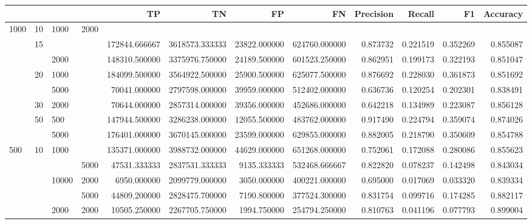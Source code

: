 \begin{tabular}{llllrrrrrrrr}
\toprule
     &    &      &      &             TP &              TN &            FP &             FN &  Precision &    Recall &        F1 &  Accuracy \\
\midrule
1000 & 10 & 1000 & 2000 &                &                 &               &                &            &           &           &           \\
     & 15 &      &      &  172844.666667 &  3618573.333333 &  23822.000000 &  624760.000000 &   0.873732 &  0.221519 &  0.352269 &  0.855087 \\
     &    & 2000 &      &  148310.500000 &  3375976.750000 &  24189.500000 &  601523.250000 &   0.862951 &  0.199173 &  0.322193 &  0.851047 \\
     & 20 & 1000 &      &  184099.500000 &  3564922.500000 &  25900.500000 &  625077.500000 &   0.876692 &  0.228030 &  0.361873 &  0.851692 \\
     &    & 5000 &      &   70041.000000 &  2797598.000000 &  39959.000000 &  512402.000000 &   0.636736 &  0.120254 &  0.202301 &  0.838491 \\
     & 30 & 2000 &      &   70644.000000 &  2857314.000000 &  39356.000000 &  452686.000000 &   0.642218 &  0.134989 &  0.223087 &  0.856128 \\
     & 50 & 500 &      &  147944.500000 &  3286238.000000 &  12055.500000 &  483762.000000 &   0.917490 &  0.224794 &  0.359074 &  0.874026 \\
     &    & 5000 &      &  176401.000000 &  3670145.000000 &  23599.000000 &  629855.000000 &   0.882005 &  0.218790 &  0.350609 &  0.854788 \\
500 & 10 & 1000 &      &  135371.000000 &  3988732.000000 &  44629.000000 &  651268.000000 &   0.752061 &  0.172088 &  0.280086 &  0.855623 \\
     &    &      & 5000 &   47531.333333 &  2837531.333333 &   9135.333333 &  532468.666667 &   0.822820 &  0.078237 &  0.142498 &  0.843034 \\
     &    & 10000 & 2000 &    6950.000000 &  2099779.000000 &   3050.000000 &  400221.000000 &   0.695000 &  0.017069 &  0.033320 &  0.839334 \\
     &    &      & 5000 &   44809.200000 &  2828475.700000 &   7190.800000 &  377524.300000 &   0.831754 &  0.099716 &  0.174285 &  0.882117 \\
     &    & 2000 & 2000 &   10505.250000 &  2267705.750000 &   1994.750000 &  254794.250000 &   0.810763 &  0.041196 &  0.077793 &  0.899004 \\

\end{tabular}
